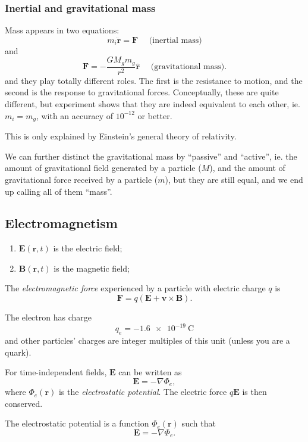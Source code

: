 \documentclass[a4paper]{article}
\begin{document}
\subsubsection{Inertial and gravitational mass}
Mass appears in two equations:
\[
  m_i\ddot{\mathbf{r}} = \mathbf{F}\quad \text{ (inertial mass)}
\]
and
\[
  \mathbf{F} = -\frac{GM_gm_g}{r^2}\hat{\mathbf{r}}\quad\text{ (gravitational mass)}.
\]
and they play totally different roles. The first is the resistance to motion, and the second is the response to gravitational forces. Conceptually, these are quite different, but experiment shows that they are indeed equivalent to each other, ie. $m_i = m_g$, with an accuracy of $10^{-12}$ or better.

This is only explained by Einstein's general theory of relativity.

We can further distinct the gravitational mass by ``passive'' and ``active'', ie. the amount of gravitational field generated by a particle ($M$), and the amount of gravitational force received by a particle ($m$), but they are still equal, and we end up calling all of them ``mass''.

\subsection{Electromagnetism}
\begin{notation}\leavevmode
  \begin{enumerate}
    \item $\mathbf{E}(\mathbf{r}, t)$ is the electric field;
    \item $\mathbf{B}(\mathbf{r}, t)$ is the magnetic field;
  \end{enumerate}
\end{notation}
\begin{law}
  The \emph{electromagnetic force} experienced by a particle with electric charge $q$ is
  \[
    \mathbf{F} = q(\mathbf{E} + \mathbf{v}\times \mathbf{B}).
  \]
\end{law}

\begin{law}
  The electron has charge
  \[
    q_e = \SI{-1.6e-19}{\coulomb}
  \]
  and other particles' charges are integer multiples of this unit (unless you are a quark).
\end{law}

\begin{law}
  For time-independent fields, $\mathbf{E}$ can be written as
  \[
    \mathbf{E} = -\nabla \Phi_e,
  \]
  where $\Phi_e(\mathbf{r})$ is the \emph{electrostatic potential}.
  The electric force $q\mathbf{E}$ is then conserved.
\end{law}
\begin{defi}
  The electrostatic potential is a function $\Phi_e(\mathbf{r})$ such that
  \[
    \mathbf{E} = -\nabla \Phi_e.
  \]
\end{defi}
\end{document}
